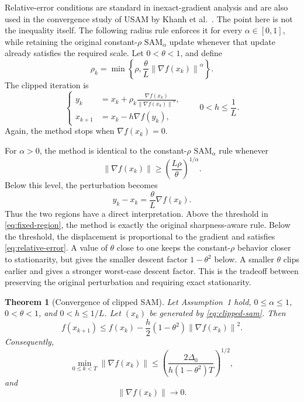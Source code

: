 \documentclass[11pt]{article}
\newtheorem{theorem}{Theorem}
\theoremstyle{remark}
\newcommand{\norm}[1]{\left\lVert #1\right\rVert}
\newcommand{\SAMa}{\mathrm{SAM}_{\alpha}}
\begin{document}
Relative-error conditions are standard in inexact-gradient analysis and are
also used in the convergence study of USAM by Khanh et
al.~\cite{Khanh2024}.  The point here is not the inequality itself.  The
following radius rule enforces it for every $\alpha\in[0,1]$, while
retaining the original constant-$\rho$ $\SAMa$ update whenever that
update already satisfies the required scale.
Let $0<\theta<1$, and define
\begin{equation}\label{eq:clipped-rho}
  \rho_k=
  \min\left\{
       \rho,\frac{\theta}{L}
       \norm{\nabla f(x_k)}^\alpha
      \right\}.
\end{equation}
The clipped iteration is
\begin{equation}\label{eq:clipped-sam}
\left\{
\begin{aligned}
 y_k&=x_k+\rho_k
 \frac{\nabla f(x_k)}{\norm{\nabla f(x_k)}^\alpha},\\
 x_{k+1}&=x_k-h\nabla f(y_k),
\end{aligned}
\right.
\qquad 0<h\leq\frac1L.
\end{equation}
Again, the method stops when $\nabla f(x_k)=0$.

For $\alpha>0$, the method is identical to the constant-$\rho$
$\SAMa$ rule whenever
\begin{equation}\label{eq:fixed-region}
  \norm{\nabla f(x_k)}
  \geq\left(\frac{L\rho}{\theta}\right)^{1/\alpha}.
\end{equation}
Below this level, the perturbation becomes
$$
 y_k-x_k=\frac{\theta}{L}\nabla f(x_k).
$$
Thus the two regions have a direct interpretation.  Above the threshold in
\eqref{eq:fixed-region}, the method is exactly the original sharpness-aware
rule.  Below the threshold, the displacement is proportional to the gradient
and satisfies \eqref{eq:relative-error}.  A value of $\theta$ close to one
keeps the constant-$\rho$ behavior closer to stationarity, but gives the
smaller descent factor $1-\theta^2$ below.  A smaller $\theta$ clips
earlier and gives a stronger worst-case descent factor.  This is the tradeoff
between preserving the original perturbation and requiring exact
stationarity.

\begin{theorem}[Convergence of clipped SAM]\label{thm:clipped}
Let Assumption~1 hold, $0\leq\alpha\leq1$, $0<\theta<1$, and
$0<h\leq1/L$.  Let $(x_k)$ be generated by \eqref{eq:clipped-sam}.
Then
\begin{equation}\label{eq:clipped-descent}
 f(x_{k+1})
 \leq f(x_k)
 -\frac h2(1-\theta^2)\norm{\nabla f(x_k)}^2.
\end{equation}
Consequently,
\begin{equation}\label{eq:clipped-rate}
 \min_{0\leq k<T}\norm{\nabla f(x_k)}
 \leq
 \left(
 \frac{2\Delta_0}{h(1-\theta^2)T}
 \right)^{1/2},
\end{equation}
and
\begin{equation}\label{eq:clipped-gradient-limit}
  \norm{\nabla f(x_k)}\longrightarrow0.
\end{equation}
\end{theorem}
\end{document}
